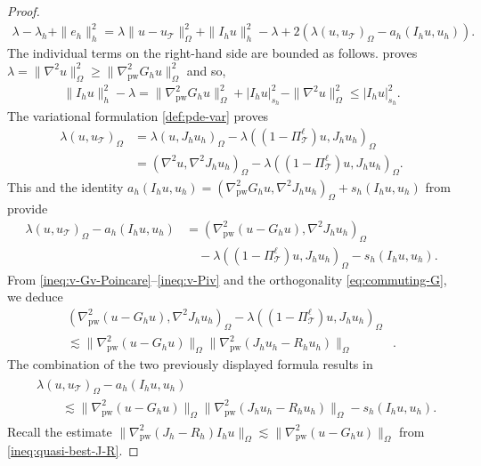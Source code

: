 \documentclass[a4paper]{amsart}
\numberwithin{equation}{section}
\def\T{\mathcal{T}}
\def\pw{\mathrm{pw}}
\theoremstyle{definition}
\theoremstyle{remark}
\numberwithin{theorem}{section}
\numberwithin{equation}{section}
\numberwithin{table}{section}
\numberwithin{figure}{section}
\begin{document}
\begin{proof}
\begin{align}
		\lambda - \lambda_h + \|e_h\|_{h}^2 = \lambda\|u - u_\T\|_\Omega^2 + \|I_h u\|_{h}^2 - \lambda + 2(\lambda(u,u_\T)_{\Omega} - a_h(I_h u, u_h)).
	\end{align}
	The individual terms on the right-hand side are bounded as follows.
	 proves $\lambda = \|\nabla^2 u\|_\Omega^2 \geq \|\nabla_\pw^2 G_h u\|_\Omega^2$ and so,
	\begin{align}\label{ineq:proof-a-pr-eig-1}
		\|I_h u\|_{h}^2 - \lambda = \|\nabla_\pw^2 G_h u\|_\Omega^2 + |I_h u|_{s_h}^2 - \|\nabla^2 u\|_\Omega^2 \leq |I_h u|_{s_h}^2.
	\end{align}
	The variational formulation \eqref{def:pde-var} proves
	\begin{align*}
		\lambda(u,u_\T)_{\Omega} &= \lambda(u, J_h u_h)_{\Omega} - \lambda((1 - \Pi_\T^{\ell})u, J_h u_h)_{\Omega}\\
		&= (\nabla^2 u, \nabla^2 J_h u_h)_{\Omega} - \lambda((1 - \Pi_\T^{\ell})u, J_h u_h)_{\Omega}.
	\end{align*}
	This and the identity $a_h(I_h u, u_h) = (\nabla_\pw^2 G_h u, \nabla^2 J_h u_h)_\Omega + s_h(I_hu,u_h)$ from  provide
	\begin{align*}
		\lambda(u,u_\T)_{\Omega} - a_h(I_h u, u_h) &= (\nabla^2_\pw(u - G_h u), \nabla^2 J_h u_h)_\Omega\\
		&\quad - \lambda((1 - \Pi_\T^\ell)u, J_h u_h)_{\Omega} - s_h(I_h u, u_h).
	\end{align*}
	From \eqref{ineq:v-Gv-Poincare}--\eqref{ineq:v-Piv} and the orthogonality \eqref{eq:commuting-G}, we deduce 
	\begin{align*}
		(\nabla^2_\pw(u - G_h u), \nabla^2 J_h u_h)_\Omega
		- \lambda((1 - \Pi_\T^\ell)u, J_h u_h)_{\Omega}&\\
		\lesssim  \|\nabla^2_\pw(u - G_h u)\|_\Omega \|\nabla^2_\pw (J_h u_h - R_h u_h)\|_\Omega&.
	\end{align*}
	The combination of the two previously displayed formula results in
	\begin{align}\label{ineq:proof-a-priori-eig}
		\begin{aligned}
			&\lambda(u,u_\T)_{\Omega} - a_h(I_h u, u_h)\\
			&\qquad \lesssim \|\nabla^2_\pw(u - G_h u)\|_\Omega\|\nabla_\pw^2(J_h u_h - R_h u_h)\|_\Omega - s_h(I_h u, u_h).
		\end{aligned}
	\end{align}
	Recall the estimate $\|\nabla_\pw^2(J_h - R_h) I_h u\|_\Omega \lesssim \|\nabla_\pw^2(u - G_h u)\|_\Omega$ from \eqref{ineq:quasi-best-J-R}.

\end{proof}
\end{document}

